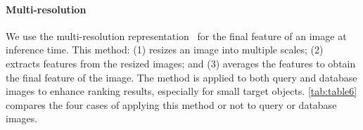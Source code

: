 
\paragraph{Multi-resolution}

We use the multi-resolution representation~\cite{Gordo01} for the final feature of an image at inference time. This method: (1) resizes an image into multiple scales; (2) extracts features from the resized images; and (3) averages the features to obtain the final feature of the image. The method is applied to both query and database images to enhance ranking results, especially for small target objects. \autoref{tab:table6} compares the four cases of applying this method or not to query or database images.
